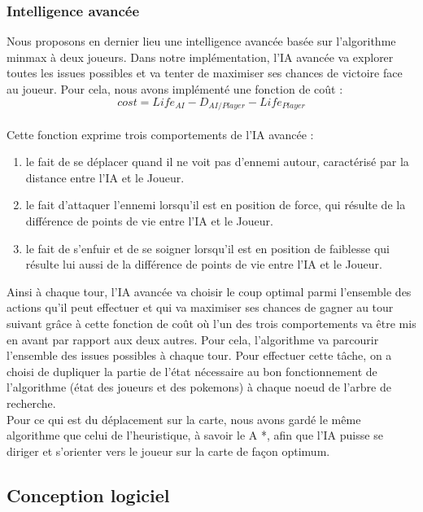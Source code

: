 \documentclass[a4paper,12pt]{article}
\begin{document}
    \subsubsection{Intelligence avancée}
        Nous proposons en dernier lieu une intelligence avancée basée sur l'algorithme minmax à deux joueurs. Dans notre implémentation, l'IA avancée va explorer toutes les issues possibles et va tenter de maximiser ses chances de victoire face au joueur. Pour cela, nous avons implémenté une fonction de coût : 
        \begin{equation}
        cost  =  Life_{AI} -   D_{AI/Player} - Life_{Player}
        \end{equation}        \\Cette fonction exprime trois comportements de l'IA avancée :\begin{enumerate}
            \item le fait de se déplacer quand il ne voit pas d'ennemi autour, caractérisé par la distance entre l'IA et le Joueur.
            \item le fait d'attaquer l'ennemi lorsqu'il est en position de force, qui résulte de la différence de points de vie entre l'IA et le Joueur.
            \item le fait de s'enfuir et de se soigner lorsqu'il est en position de faiblesse qui résulte lui aussi de la différence de points de vie entre l'IA et le Joueur.
        \end{enumerate}
        
        Ainsi à chaque tour, l'IA avancée va choisir le coup optimal parmi l'ensemble des actions qu'il peut effectuer et qui va maximiser ses chances de gagner au tour suivant grâce à cette fonction de coût où l'un des trois comportements va être mis en avant par rapport aux deux autres. Pour cela, l'algorithme va parcourir l'ensemble des issues possibles à chaque tour. Pour effectuer cette tâche, on a choisi de dupliquer la partie de l'état nécessaire au bon fonctionnement de l'algorithme (état des joueurs et des pokemons) à chaque noeud de l'arbre de recherche.\\
        Pour ce qui est du déplacement sur la carte, nous avons gardé le même algorithme que celui de l'heuristique, à savoir le A *, afin que l'IA puisse se diriger et s'orienter vers le joueur sur la carte de façon optimum.
    
    
    \clearpage
    \subsection{Conception logiciel}
    
\end{document}
